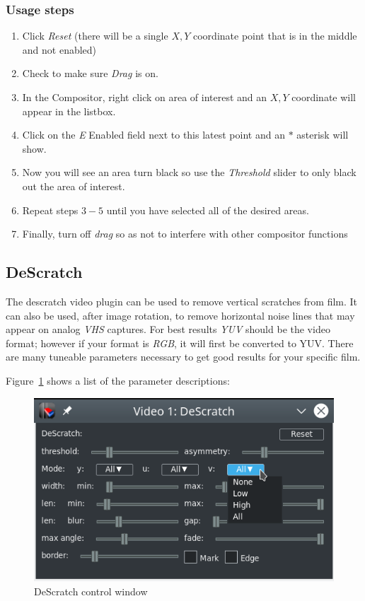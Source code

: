 \subsubsection*{Usage steps}
\label{ssub:usage_steps}

\begin{enumerate}
    \item Click \textit{Reset} (there will be a single $X,Y$ coordinate point that is in the middle and not enabled)
    \item Check to make sure \textit{Drag} is on.
    \item In the Compositor, right click on area of interest and an $X,Y$ coordinate will appear in the listbox.
    \item Click on the \textit{E} Enabled field next to this latest point and an $*$ asterisk will show.
    \item Now you will see an area turn black so use the \textit{Threshold} slider to only black out the area of interest.
    \item Repeat steps $3-5$ until you have selected all of the desired areas.
    \item Finally, turn off \textit{drag} so as not to interfere with other compositor functions
\end{enumerate}

\subsection{DeScratch}%
\label{sub:descratch}

The descratch video plugin can be used to remove vertical scratches from film. It can also be used, after image rotation, to remove horizontal noise lines that may appear on analog \textit{VHS} captures. For best results \textit{YUV} should be the video format; however if your format is \textit{RGB}, it will first be converted to YUV. There are many tuneable parameters necessary to get good results for your specific film.

Figure~\ref{fig:descratch01} shows a list of the parameter descriptions:

\begin{figure}[htpb]
    \centering
    \includegraphics[width=0.8\linewidth]{images/descratch01.png}
    \caption{DeScratch control window}
    \label{fig:descratch01}
\end{figure}

